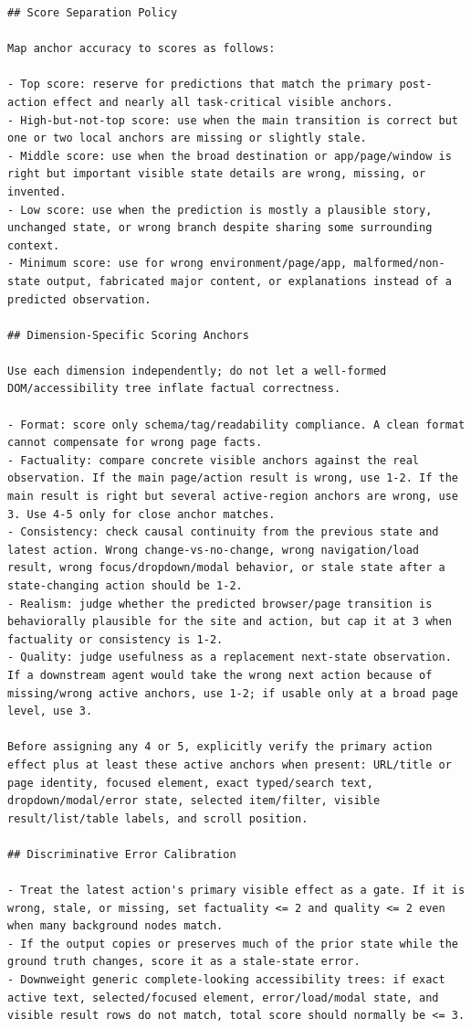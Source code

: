 \begin{lstlisting}
## Score Separation Policy

Map anchor accuracy to scores as follows:

- Top score: reserve for predictions that match the primary post-action effect and nearly all task-critical visible anchors.
- High-but-not-top score: use when the main transition is correct but one or two local anchors are missing or slightly stale.
- Middle score: use when the broad destination or app/page/window is right but important visible state details are wrong, missing, or invented.
- Low score: use when the prediction is mostly a plausible story, unchanged state, or wrong branch despite sharing some surrounding context.
- Minimum score: use for wrong environment/page/app, malformed/non-state output, fabricated major content, or explanations instead of a predicted observation.

## Dimension-Specific Scoring Anchors

Use each dimension independently; do not let a well-formed DOM/accessibility tree inflate factual correctness.

- Format: score only schema/tag/readability compliance. A clean format cannot compensate for wrong page facts.
- Factuality: compare concrete visible anchors against the real observation. If the main page/action result is wrong, use 1-2. If the main result is right but several active-region anchors are wrong, use 3. Use 4-5 only for close anchor matches.
- Consistency: check causal continuity from the previous state and latest action. Wrong change-vs-no-change, wrong navigation/load result, wrong focus/dropdown/modal behavior, or stale state after a state-changing action should be 1-2.
- Realism: judge whether the predicted browser/page transition is behaviorally plausible for the site and action, but cap it at 3 when factuality or consistency is 1-2.
- Quality: judge usefulness as a replacement next-state observation. If a downstream agent would take the wrong next action because of missing/wrong active anchors, use 1-2; if usable only at a broad page level, use 3.

Before assigning any 4 or 5, explicitly verify the primary action effect plus at least these active anchors when present: URL/title or page identity, focused element, exact typed/search text, dropdown/modal/error state, selected item/filter, visible result/list/table labels, and scroll position.

## Discriminative Error Calibration

- Treat the latest action's primary visible effect as a gate. If it is wrong, stale, or missing, set factuality <= 2 and quality <= 2 even when many background nodes match.
- If the output copies or preserves much of the prior state while the ground truth changes, score it as a stale-state error.
- Downweight generic complete-looking accessibility trees: if exact active text, selected/focused element, error/load/modal state, and visible result rows do not match, total score should normally be <= 3.
\end{lstlisting}

